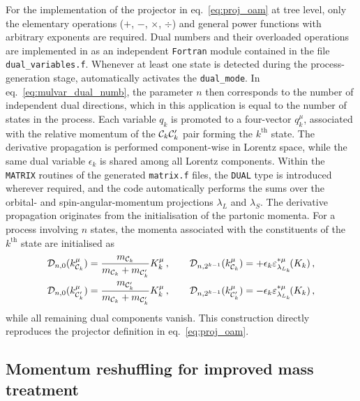 For the implementation of the projector in eq.~\eqref{eq:proj_oam} at tree level, only the elementary operations ($+$, $-$, $\times$, $\div$) and general power functions with arbitrary exponents are required. Dual numbers and their overloaded operations are implemented in \mgshort{} as an independent {\tt Fortran} module contained in the file {\tt dual\_variables.f}.
Whenever at least one \pwavetxt{} state is detected during the process-generation stage, \mgshort{} automatically activates the {\tt dual\_mode}. In eq.~\eqref{eq:mulvar_dual_numb}, the parameter $n$ then corresponds to the number of independent dual directions, which in this application is equal to the number of \pwavetxt{} states in the process. Each variable $q_k$ is promoted to a four-vector $q_k^\mu$, associated with the relative momentum of the ${\cal C}_k{\cal C}_k^\prime$ pair forming the $k^{\mathrm{th}}$ \pwavetxt{} state. The derivative propagation is performed component-wise in Lorentz space, while the same dual variable $\epsilon_k$ is shared among all Lorentz components. Within the {\tt MATRIX} routines of the generated {\tt matrix.f} files, the {\tt DUAL} type is introduced wherever required, and the code automatically performs the sums over the orbital- and spin-angular-momentum projections $\lambda_{L}$ and $\lambda_{S}$.
The derivative propagation originates from the initialisation of the partonic momenta. For a process involving $n$ \pwavetxt{} states, the momenta associated with the constituents of the $k^{\mathrm{th}}$ \pwavetxt{} state are initialised as
\begin{equation}
\begin{aligned}
    {\cal D}_{n,0}(k_{{\cal C}_k}^\mu) & = \frac{m_{{\cal C}_k}}{m_{{\cal C}_k}+m_{{\cal C}^\prime_k}} K_k^\mu\,,
    \qquad
    {\cal D}_{n,2^{k-1}}(k_{{\cal C}_k}^\mu) = +\epsilon_{k}\varepsilon_{\lambda_{L_k}}^{*\mu}\!(K_k)\,,
    \\
    {\cal D}_{n,0}(k_{{\cal C}_k^\prime}^\mu) & = \frac{m_{{\cal C}^\prime_k}}{m_{{\cal C}_k}+m_{{\cal C}^\prime_k}}K_k^\mu\,,
    \qquad 
    {\cal D}_{n,2^{k-1}}(k_{{\cal C}_k^\prime}^\mu) = -\epsilon_{k}\varepsilon_{\lambda_{L_k}}^{*\mu}\!(K_k)\,,
\end{aligned}
\label{eq:dual_mom_init}
\end{equation}
while all remaining dual components vanish. This construction directly reproduces the projector definition in eq.~\eqref{eq:proj_oam}.


\subsection{Momentum reshuffling for improved mass treatment}\label{sec:resh}

